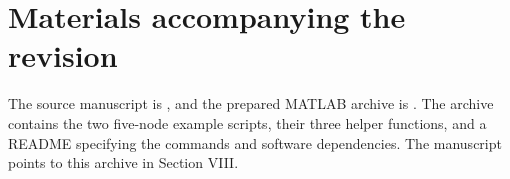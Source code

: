 \documentclass[11pt]{article}
\begin{document}
\section*{Materials accompanying the revision}

The source manuscript is , and the prepared MATLAB archive
is . The archive contains the two
five-node example scripts, their three helper functions, and a README
specifying the commands and software dependencies. The manuscript points
to this archive in Section VIII.
\end{document}
